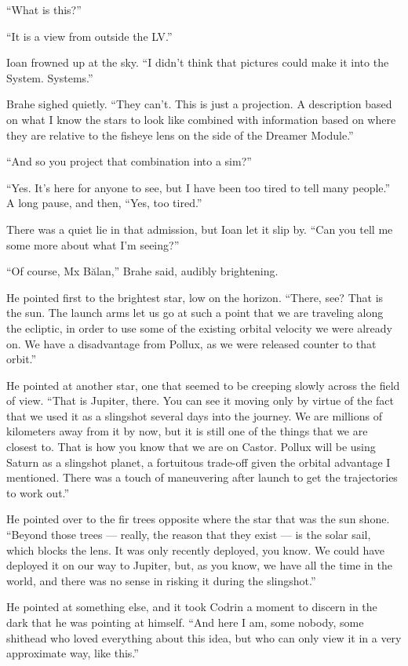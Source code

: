 ``What is this?''

``It is a view from outside the LV.''

Ioan frowned up at the sky. ``I didn't think that pictures could make it into the System. Systems.''

Brahe sighed quietly. ``They can't. This is just a projection. A description based on what I know the stars to look like combined with information based on where they are relative to the fisheye lens on the side of the Dreamer Module.''

``And so you project that combination into a sim?''

``Yes. It's here for anyone to see, but I have been too tired to tell many people.'' A long pause, and then, ``Yes, too tired.''

There was a quiet lie in that admission, but Ioan let it slip by. ``Can you tell me some more about what I'm seeing?''

``Of course, Mx Bălan,'' Brahe said, audibly brightening.

He pointed first to the brightest star, low on the horizon. ``There, see? That is the sun. The launch arms let us go at such a point that we are traveling along the ecliptic, in order to use some of the existing orbital velocity we were already on. We have a disadvantage from Pollux, as we were released counter to that orbit.''

He pointed at another star, one that seemed to be creeping slowly across the field of view. ``That is Jupiter, there. You can see it moving only by virtue of the fact that we used it as a slingshot several days into the journey. We are millions of kilometers away from it by now, but it is still one of the things that we are closest to. That is how you know that we are on Castor. Pollux will be using Saturn as a slingshot planet, a fortuitous trade-off given the orbital advantage I mentioned. There was a touch of maneuvering after launch to get the trajectories to work out.''

He pointed over to the fir trees opposite where the star that was the sun shone. ``Beyond those trees — really, the reason that they exist — is the solar sail, which blocks the lens. It was only recently deployed, you know. We could have deployed it on our way to Jupiter, but, as you know, we have all the time in the world, and there was no sense in risking it during the slingshot.''

He pointed at something else, and it took Codrin a moment to discern in the dark that he was pointing at himself. ``And here I am, some nobody, some shithead who loved everything about this idea, but who can only view it in a very approximate way, like this.''

